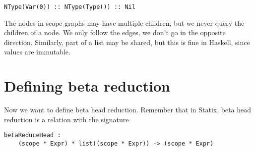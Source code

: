 \begin{lstlisting}
NType(Var(0)) :: NType(Type()) :: Nil
\end{lstlisting}

The nodes in scope graphs may have multiple children, but we never query the children of a node. We only follow the edges, we don't go in the opposite direction. Similarly, part of a list may be shared, but this is fine in Haskell, since values are immutable. 

\section{Defining beta reduction}

Now we want to define beta head reduction. Remember that in Statix, beta head reduction is a relation with the signature
\begin{lstlisting}
betaReduceHead : 
	(scope * Expr) * list((scope * Expr)) -> (scope * Expr)
\end{lstlisting}


